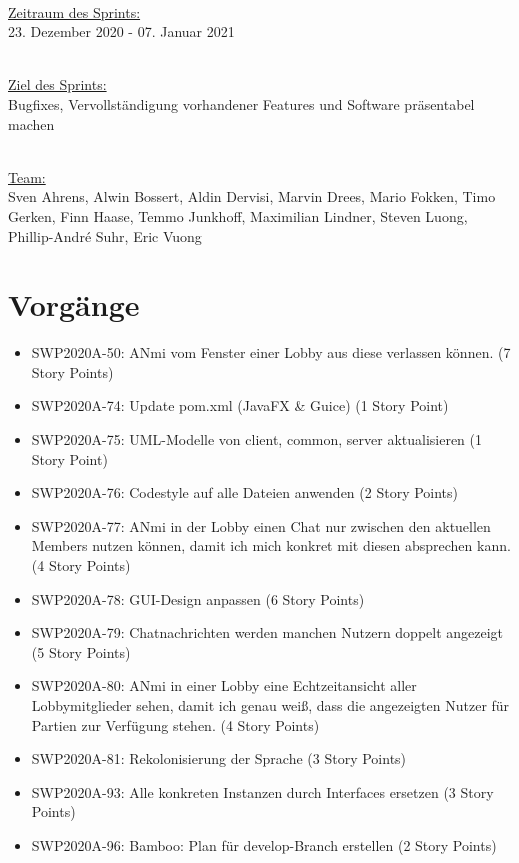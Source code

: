 \documentclass[12pt,a4paper, oneside]{article}
\begin{document}
    \noindent
    \\
    \underline{Zeitraum des Sprints:}
    \\
    23. Dezember 2020 - 07. Januar 2021

    \noindent
    \\
    \underline{Ziel des Sprints:}
    \\
    Bugfixes, Vervollständigung vorhandener Features und Software präsentabel machen


    \noindent
    \\
    \underline {Team:}
    \\
    Sven Ahrens, Alwin Bossert, Aldin Dervisi, Marvin Drees, Mario Fokken,
    Timo Gerken, Finn Haase, Temmo Junkhoff, Maximilian Lindner, Steven Luong, Phillip-André Suhr, Eric Vuong


    \section{Vorgänge}

    \begin{itemize}

        \item SWP2020A-50: ANmi vom Fenster einer Lobby aus diese verlassen können. (7 Story Points)

        \item SWP2020A-74: Update pom.xml (JavaFX & Guice) (1 Story Point)

        \item SWP2020A-75: UML-Modelle von client, common, server aktualisieren (1 Story Point)

        \item SWP2020A-76: Codestyle auf alle Dateien anwenden (2 Story Points)

        \item SWP2020A-77: ANmi in der Lobby einen Chat nur zwischen den aktuellen Members nutzen können, damit ich mich konkret mit diesen absprechen kann. (4 Story Points)

        \item SWP2020A-78: GUI-Design anpassen (6 Story Points)

        \item SWP2020A-79: Chatnachrichten werden manchen Nutzern doppelt angezeigt (5 Story Points)

        \item SWP2020A-80: ANmi in einer Lobby eine Echtzeitansicht aller Lobbymitglieder sehen, damit ich genau weiß, dass die angezeigten Nutzer für Partien zur Verfügung stehen. (4 Story Points)

        \item SWP2020A-81: Rekolonisierung der Sprache (3 Story Points)

        \item SWP2020A-93: Alle konkreten Instanzen durch Interfaces ersetzen (3 Story Points)

        \item SWP2020A-96: Bamboo: Plan für develop-Branch erstellen (2 Story Points)

    \end{itemize}
\end{document}
